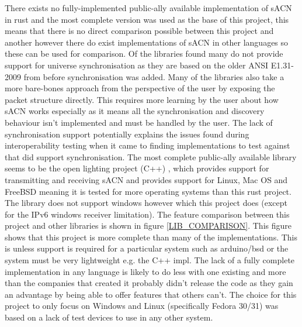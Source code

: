 \documentclass[11pt,a4paper]{article}
\begin{document}
There exists no fully-implemented public-ally available implementation of sACN in rust and the most complete version was used as the base of this project, this means that there is no direct comparison possible between this project and another however there do exist implementations of sACN in other languages so these can be used for comparison. Of the libraries found many do not provide support for universe synchronisation as they are based on the older ANSI E1.31-2009 from before synchronisation was added. Many of the libraries also take a more bare-bones approach from the perspective of the user by exposing the packet structure directly. This requires more learning by the user about how sACN works especially as it means all the synchronisation and discovery behaviour isn't implemented and must be handled by the user. The lack of synchronisation support potentially explains the issues found during interoperability testing when it came to finding implementations to test against that did support synchronisation. The most complete public-ally available library seems to be the open lighting project (C++) \cite{OPEN_LIGHTING_IMPL}, which provides support for transmitting and receiving sACN and provides support for Linux, Mac OS and FreeBSD meaning it is tested for more operating systems than this rust project. The library does not support windows however which this project does (except for the IPv6 windows receiver limitation). The feature comparison between this project and other libraries is shown in figure \ref{LIB_COMPARISON}. This figure shows that this project is more complete than many of the implementations. This is unless support is required for a particular system such as arduino/bsd or the system must be very lightweight e.g. the C++ impl. The lack of a fully complete implementation in any language is likely to do less with one existing and more than the companies that created it probably didn't release the code as they gain an advantage by being able to offer features that others can't. The choice for this project to only focus on Windows and Linux (specifically Fedora 30/31) was based on a lack of test devices to use in any other system.\\
\end{document}
